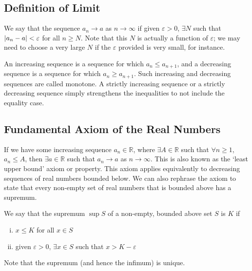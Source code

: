 \subsection{Definition of Limit}
\begin{definition}
	We say that the sequence \(a_n \to a\) as \(n \to \infty\) if given \(\varepsilon > 0\), \(\exists N\) such that \(\abs{a_n - a} < \varepsilon\) for all \(n \geq N\). Note that this \(N\) is actually a function of \(\varepsilon\); we may need to choose a very large \(N\) if the \(\varepsilon\) provided is very small, for instance.
\end{definition}
\begin{definition}
	An increasing sequence is a sequence for which \(a_n \leq a_{n+1}\), and a decreasing sequence is a sequence for which \(a_n \geq a_{n+1}\). Such increasing and decreasing sequences are called monotone.
	A strictly increasing sequence or a strictly decreasing sequence simply strengthens the inequalities to not include the equality case.
\end{definition}

\subsection{Fundamental Axiom of the Real Numbers}
If we have some increasing sequence \(a_n \in \mathbb R\), where \(\exists A \in \mathbb R\) such that \(\forall n \geq 1\), \(a_n \leq A\), then \(\exists a \in \mathbb R\) such that \(a_n \to a\) as \(n \to \infty\). This is also known as the `least upper bound' axiom or property. This axiom applies equivalently to decreasing sequences of real numbers bounded below. We can also rephrase the axiom to state that every non-empty set of real numbers that is bounded above has a supremum.
\begin{definition}
	We say that the supremum \(\sup S\) of a non-empty, bounded above set \(S\) is \(K\) if
	\begin{enumerate}[(i)]
		\item \(x \leq K\) for all \(x \in S\)
		\item given \(\varepsilon > 0\), \(\exists x \in S\) such that \(x > K - \varepsilon\)
	\end{enumerate}
\end{definition}
Note that the supremum (and hence the infimum) is unique.


